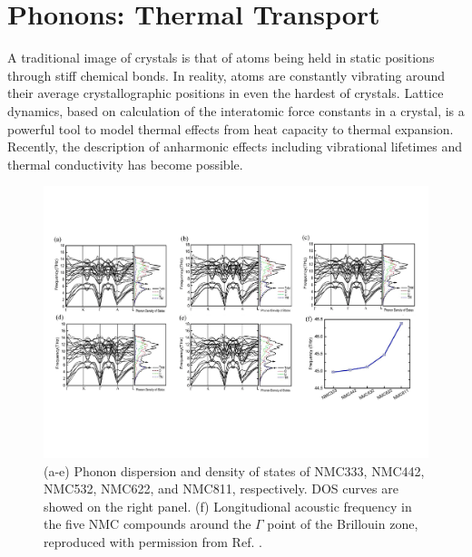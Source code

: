 \documentclass[aps,prb,twocolumn,superscriptaddress,reprint]{revtex4-1}
\begin{document}
\section*{Phonons: Thermal Transport}
A traditional image of crystals is that of atoms being held in static positions through stiff chemical bonds. 
In reality, atoms are constantly vibrating around their average crystallographic positions in even the hardest of crystals. 
Lattice dynamics, based on calculation of the interatomic force constants in a crystal, is a powerful tool to model thermal effects from heat capacity to thermal expansion.
Recently, the description of anharmonic effects including vibrational lifetimes and thermal conductivity has become possible.

\begin{figure}[tb]
  \centering
    \includegraphics[width=14cm]{Figures/P_phonon_2.pdf}
    \caption{(a-e) Phonon dispersion and density of states of NMC333, NMC442, NMC532, NMC622, and NMC811, respectively. DOS curves are showed on the right panel. (f) Longitudional acoustic frequency in the five NMC compounds around the $\Gamma$ point of the Brillouin zone, reproduced with permission from Ref. .}
  \label{figure_phonon}
\end{figure}
\end{document}
